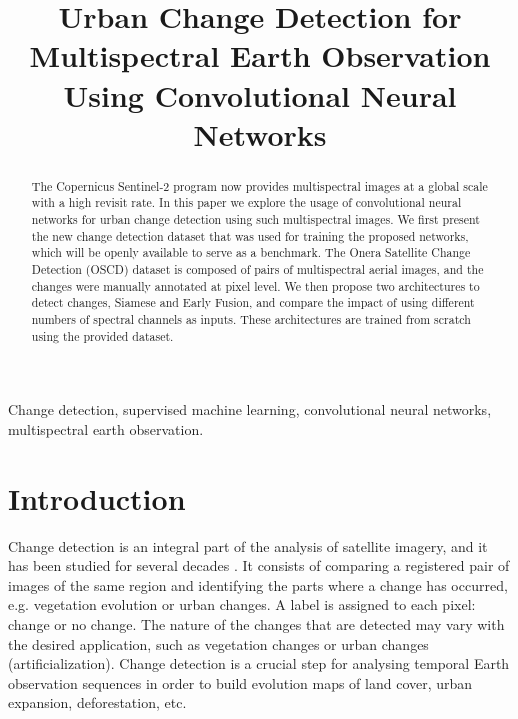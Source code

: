 \documentclass{article}
\title{Urban Change Detection for Multispectral Earth Observation \\ Using Convolutional Neural Networks}
\begin{document}
\maketitle

\begin{abstract}


The Copernicus Sentinel-2 program now provides multispectral images at a global scale with a high revisit rate. In this paper we explore the usage of convolutional neural networks for urban change detection using such multispectral images. We first present the new change detection dataset that was used for training the proposed networks, which will be openly available to serve as a benchmark. The Onera Satellite Change Detection (OSCD) dataset is composed of pairs of multispectral aerial images, and the changes were manually annotated at pixel level. 
We then propose two architectures to detect changes, Siamese and Early Fusion, and compare the impact of using different numbers of spectral channels as inputs.
These architectures are trained from scratch using the provided dataset.


\end{abstract}
\begin{keywords}
Change detection, supervised machine learning, convolutional neural networks, multispectral earth observation.
\end{keywords}

\section{Introduction}
\label{sec:intro}

Change detection is an integral part of the analysis of satellite imagery, and it has been studied for several decades \cite{hussain2013change,singh1989review}. It consists of comparing a registered pair of images of the same region and identifying the parts where a change has occurred, e.g. vegetation evolution or urban changes. A label is assigned to each pixel: change or no change. The nature of the changes that are detected may vary with the desired application, such as vegetation changes or urban changes (artificialization). Change detection is a crucial step for analysing temporal Earth observation sequences in order to build evolution maps of land cover, urban expansion, deforestation, etc.
\end{document}
